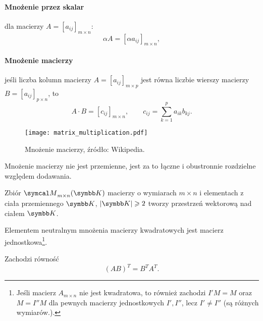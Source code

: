 \paragraph{Mnożenie przez skalar} dla macierzy $A = [a_{ij}]_{m \times n}$:
    \[ \alpha A = [\alpha a_{ij}]_{m \times n}, \]
\paragraph{Mnożenie macierzy} jeśli liczba kolumn macierzy $A = [a_{ij}]_{m \times p}$ jest równa liczbie wierszy macierzy $B = [a_{ij}]_{p \times n}$, to
    \[ A \cdot B = [c_{ij}]_{m \times n}, \qquad c_{ij} = \sum_{k=1}^p a_{ik}b_{kj}. \]

\begin{figure}[h]
    \centering
    \texttt{[image: matrix\_multiplication.pdf]}
    \caption{Mnożenie macierzy, źródło: Wikipedia.}
\end{figure}

\begin{remark}
    Mnożenie macierzy nie jest przemienne, jest za to łączne i obustronnie rozdzielne względem dodawania.
\end{remark}

\begin{fact}
    Zbiór $\sM_{m \times n}(\KK)$ macierzy o wymiarach $m \times n$ i elementach z ciała przemiennego $\KK$, $|\KK| \geq 2$ tworzy przestrzeń wektorową nad ciałem $\KK$.
\end{fact}

\begin{fact}
    Elementem neutralnym mnożenia macierzy kwadratowych jest macierz jednostkowa\footnote{Jeśli macierz $A_{m\times n}$ nie jest kwadratowa, to również zachodzi $I'M = M$ oraz $M = I''M$ dla pewnych macierzy jednostkowych $I', I''$, lecz $I' \neq I''$ (są różnych wymiarów.).}.
\end{fact}

\begin{fact}
    \label{f:AB^T = B^T A^T}
    Zachodzi równość
    \[ (AB)^T = B^T A^T. \]
\end{fact}